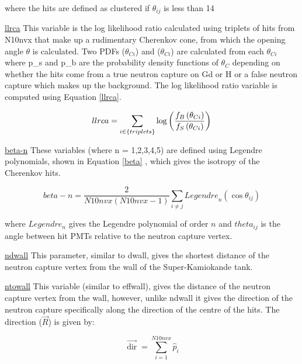 \documentclass{article}
\begin{document}
where the hits are defined as clustered if $\theta_{ij}$ is less than 14


\underline{llrca}
\newline
This variable is the log likelihood ratio calculated using triplets of hits from N10nvx that make up a rudimentary Cherenkov cone, from which the opening angle $\theta$ is calculated. Two PDFs ($\theta_{Ci}$) and ($\theta_{Ci}$) are calculated from each $\theta_{Ci}$ where p\_s and p\_b are the probability density functions of $\theta_{C}$ depending on whether the hits come from a true neutron capture on Gd or H or a false neutron capture which makes up the background. The log likelihood ratio variable is computed using Equation {\ref{llrca}}.

\begin{equation}
\label{llrca}
\newline
  llrca =\sum_{i \in\{ { triplets }\}} \log \left(\frac{f_{B}\left(\theta_{C i}\right)}{f_{S}\left(\theta_{C i}\right)}\right)
\end{equation}


\underline{beta-n}
\newline
These variables (where n = 1,2,3,4,5) are defined using Legendre polynomials, shown in Equation \ref{beta} \cite{snopaper}, which gives the isotropy of the Cherenkov hits.

\begin{equation}
\label{beta}
 beta- n=\frac{2}{N 10 {nvx}(N 10 {nvx}-1)} \sum_{i \neq j}  { Legendre }_{n}\left(\cos \theta_{i j}\right)
\end{equation}

where $Legendre_n$ gives the Legendre polynomial of order $n$ and $theta_{ij}$ is the angle between hit PMTs relative to the neutron capture vertex.



\underline{ndwall}
\newline
This parameter, similar to dwall, gives the shortest distance of the neutron capture vertex from the wall of the Super-Kamiokande tank.
\newline



\underline{ntowall}
\newline
This variable (similar to effwall), gives the distance of the neutron capture vertex from the wall, however, unlike ndwall it gives the direction of the neutron capture specifically along the direction of the centre of the hits. The direction ($\overrightarrow{R}$) is given by:

\begin{equation}
\overrightarrow{\operatorname{dir}}=\sum_{i=1}^{N 10 n v x} \hat{p}_{i}
\end{equation}
\end{document}
